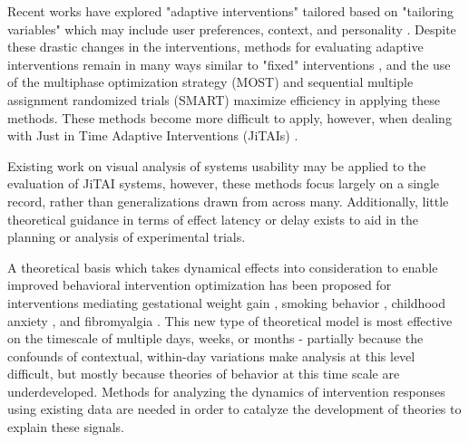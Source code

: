 Recent works have explored "adaptive interventions" tailored based on "tailoring variables" which may include user preferences, context, and personality \cite{collins2004}.
Despite these drastic changes in the interventions, methods for evaluating adaptive interventions remain in many ways similar to "fixed" interventions \cite{collins2004}, and the use of the multiphase optimization strategy (MOST) and sequential multiple assignment randomized trials (SMART) \cite{collins2007} maximize efficiency in applying these methods.
These methods become more difficult to apply, however, when dealing with Just in Time Adaptive Interventions (JiTAIs) \cite{nahum2014just}.

Existing work on visual analysis of systems usability \cite{harrison1994} may be applied to the evaluation of JiTAI systems, however, these methods focus largely on a single record, rather than generalizations drawn from across many.
Additionally, little theoretical guidance in terms of effect latency or delay exists to aid in the planning or analysis of experimental trials.

A theoretical basis which takes dynamical effects into consideration to enable improved behavioral intervention optimization has been proposed for interventions mediating gestational weight gain \cite{dong2013}, smoking behavior \cite{timms2014}, childhood anxiety \cite{pina2014}, and fibromyalgia \cite{deshpande2014}.
This new type of theoretical model is most effective on the timescale of multiple days, weeks, or months - partially because the confounds of contextual, within-day variations make analysis at this level difficult, but mostly because theories of behavior at this time scale are underdeveloped.
Methods for analyzing the dynamics of intervention responses using existing data are needed in order to catalyze the development of theories to explain these signals.
